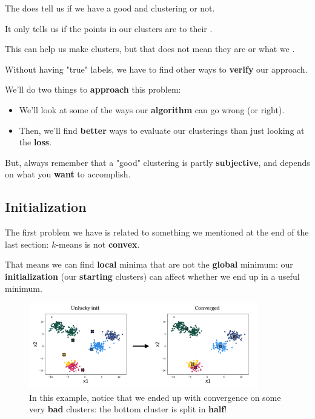     \begin{clarification}
        The  does  tell us if we have a good and  clustering or not.
        
        It only tells us if the points in our clusters are  to their .
        
        This can help us make  clusters, but that does not mean they are  or what we .
    \end{clarification}
    
    Without having "true" labels, we have to find other ways to \textbf{verify} our approach.
    
    We'll do two things to \textbf{approach} this problem:
    
    \begin{itemize}
        \item We'll look at some of the ways our \textbf{algorithm} can go wrong (or right).
        
        \item Then, we'll find \textbf{better} ways to evaluate our clusterings than just looking at the \textbf{loss}.
    \end{itemize}
    
    But, always remember that a "good" clustering is partly \textbf{subjective}, and depends on what you \textbf{want} to accomplish.

    \subsection{Initialization}
    
        The first problem we have is related to something we mentioned at the end of the last section: $k$-means is not \textbf{convex}. 
        
        That means we can find \textbf{local} minima that are not the \textbf{global} minimum: our \textbf{initialization} (our \textbf{starting} clusters) can affect whether we end up in a useful minimum.
            
        \begin{figure}[H]
            \centering
            \includegraphics[width=100mm,scale=0.4]{images/clustering_images/unlucky_init.png}
            \caption*{In this example, notice that we ended up with convergence on some very \textbf{bad} clusters: the bottom cluster is split in \textbf{half}!}
        \end{figure}
        
